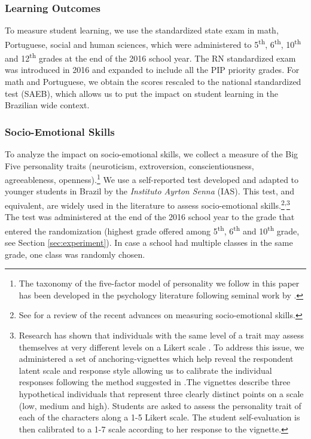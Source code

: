 \documentclass[11pt,a4paper]{article}
\begin{document}
\subsubsection*{Learning Outcomes}
To measure student learning, we use the standardized state exam in math, Portuguese, social and human sciences, which were administered to 5\textsuperscript{th}, 6\textsuperscript{th}, 10\textsuperscript{th} and 12\textsuperscript{th} grades at the end of the 2016 school year. The RN standardized exam was introduced in 2016 and expanded to include all the PIP priority grades. For math and Portuguese, we obtain the scores rescaled to the national standardized test (SAEB), which allows us to put the impact on student learning in the Brazilian wide context. %

\subsubsection*{Socio-Emotional Skills} 
To analyze the impact on socio-emotional skills, we collect a measure of the Big Five personality traits (neuroticism, extroversion, conscientiousness, agreeableness, openness).\footnote{The taxonomy of the five-factor model of personality we follow in this paper has been developed in the psychology literature following seminal work by \citet{fiske1949consistency}.} We use a self-reported test developed and adapted to younger students in Brazil by the \textit{Instituto Ayrton Senna} (IAS). This test, and equivalent, are widely used in the literature to assess socio-emotional skills.\footnote{See \cite{kautz2014fostering} for a review of the recent advances on measuring socio-emotional skills.}\textsuperscript{,}\footnote{Research has shown that individuals with the same level of a trait may assess themselves at very different levels on a Likert scale \citep{primi2016anchor}. To address this issue, we administered a set of anchoring-vignettes which help reveal the respondent latent scale and response style allowing us to calibrate the individual responses following the method suggested in \cite{primi2016anchor}.The vignettes describe three hypothetical individuals that represent three clearly distinct points on a scale (low, medium and high). Students are asked to assess the personality trait of each of the characters along a 1-5 Likert scale. The student self-evaluation is then calibrated to a 1-7 scale according to her response to the vignette.} The test was administered at the end of the 2016 school year to the grade that entered the randomization (highest grade offered among 5\textsuperscript{th}, 6\textsuperscript{th} and 10\textsuperscript{th} grade, see Section \ref{sec:experiment}). In case a school had multiple classes in the same grade, one class was randomly chosen.  
\end{document}

